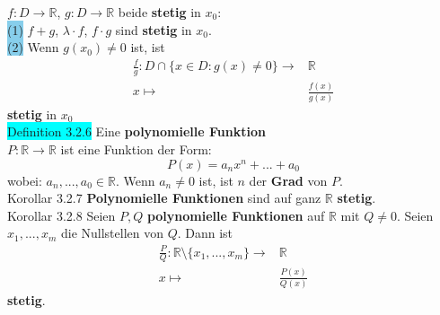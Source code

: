 \documentclass[landscape, 10pt]{article}
\newcommand{\R}{\mathbb{R}}
\begin{document}
\begin{multicols}{3}
                     \textcolor{NavyBlue}{
                     $f:D\longrightarrow\R$},
                     \textcolor{NavyBlue}{
                     $g:D\longrightarrow\R$}
                     beide \textbf{stetig} in \textcolor{NavyBlue}{$x_0$}:\\
                     \colorbox{SkyBlue}{(1)}
                            \textcolor{NavyBlue}{$f+g$},
                            \textcolor{NavyBlue}{$\lambda\cdot f$},
                            \textcolor{NavyBlue}{$f\cdot g$} 
                            sind \textbf{stetig} in 
                            \textcolor{NavyBlue}{$x_0$}.\\
                     \colorbox{SkyBlue}{(2)}
                            Wenn \textcolor{NavyBlue}{$g(x_0)\neq0$}
                            ist, ist 
                            \begin{align*}
                                   \frac{f}{g}:D\cap\{x\in D:g(x)\neq0\}
                                   \longrightarrow&\R\\
                                   x\longmapsto&\frac{f(x)}{g(x)}
                            \end{align*}
                            \textbf{stetig} in \textcolor{NavyBlue}{$x_0$}\\

              \colorbox{cyan}{Definition 3.2.6} 
                     Eine \textbf{polynomielle Funktion} \\
                     \textcolor{NavyBlue}{$P:\R\longrightarrow\R$} 
                     ist eine Funktion 
                     der Form: 
                     \begin{equation*}
                            P(x)=a_nx^n+...+a_0
                     \end{equation*}
                     wobei: \textcolor{NavyBlue}{$a_n,...,a_0\in\R$}. 
                     Wenn \textcolor{NavyBlue}{$a_n\neq0$} ist, ist 
                     \textcolor{NavyBlue}{$n$} 
                     der \textbf{Grad} von \textcolor{NavyBlue}{$P$}.\\
              \colorbox{BurntOrange}{Korollar 3.2.7} 
                     \textbf{Polynomielle Funktionen} 
                     sind auf ganz $\R$ \textbf{stetig}.\\
              \colorbox{BurntOrange}{Korollar 3.2.8} 
                     Seien $P,Q$ \textbf{polynomielle Funktionen} 
                     auf $\R$ mit \textcolor{NavyBlue}{$Q\neq0$}. Seien 
                     \textcolor{NavyBlue}{$x_1,...,x_m$} die Nullstellen von 
                     \textcolor{NavyBlue}{$Q$}. 
                     Dann ist 
                     \begin{align*}
                            \frac{P}{Q}:\R\setminus
                            \{x_1,...,x_m\}\longrightarrow&\R \\
                            x\longmapsto&\frac{P(x)}{Q(x)}
                     \end{align*}
                     \textbf{stetig}.\\

\end{multicols}
\end{document}
